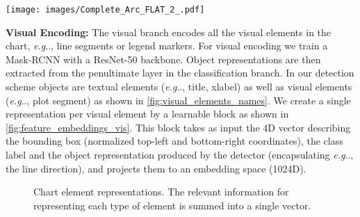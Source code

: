 \documentclass[runningheads]{llncs}
\makeatletter
\newcommand\our[1][]{CRCT\xspace}
\newcommand\ourFullname[1][]{Classification - Regression Chart Transformer (\our)\xspace}
\DeclareRobustCommand\onedot{\futurelet\@let@token\@onedot}
\def\@onedot{\ifx\@let@token.\else.\null\fi\xspace}
\def\eg{\emph{e.g}\onedot} \def\Eg{\emph{E.g}\onedot}
\makeatother
\begin{document}
\begin{figure*}[t]
\begin{center}
\texttt{[image: images/Complete\_Arc\_FLAT\_2\_.pdf]}
\end{center}
   \caption{Our \ourFullname  network architecture consists of two stages of detection and question answering. The detection stage (left) provides bounding boxes and object representations of the visual and textual elements (see Fig. \ref{fig:visual_elements_names}). These features, along with the question text, enable the co-transformers in the second stage (right) to fuse both visual and textual information into a pooled tuple of two single feature vectors $\{{\bf h_{v_0}},{\bf h_{w_0}}\}$. Next, our hybrid prediction head containing two different MLPs, outputs a classification score and a regression result. co$_i$/self$_i$: co/self attention.}
\label{fig:all_arc}
\end{figure*}

{\bf Visual Encoding:} The visual branch encodes all the visual elements in the chart, \eg, line segments or legend markers. For visual encoding we train a Mask-RCNN \cite{he2017mask} with a ResNet-50 \cite{he2015deep} backbone. Object representations are then extracted from the penultimate layer in the classification branch. In our detection scheme objects are textual elements (\eg, title, xlabel) as well as visual elements (\eg, plot segment) as shown in \cref{fig:visual_elements_names}.
We create a single representation per visual element by a learnable block as shown in \cref{fig:feature_embeddings_vis}. This block takes as input the 4D vector describing the bounding box (normalized top-left and bottom-right coordinates), the class label and the object representation produced by the detector (encapsulating \eg, the line direction), and projects them to an embedding space (1024D). 


\begin{figure}[t]\centering
    \hfill
    \caption{Chart element representations. The relevant information for representing each type of element is summed into a single vector.}
    \label{fig:feature_embeddings}
\end{figure}
\end{document}
